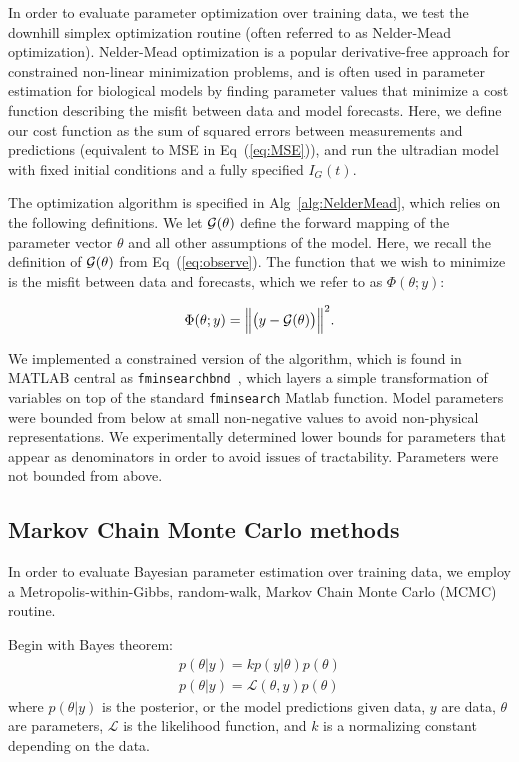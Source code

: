 \documentclass[10pt,letterpaper]{article}
\begin{document}
In order to evaluate parameter optimization over training data, we test the downhill simplex optimization routine (often referred to as Nelder-Mead optimization). 
Nelder-Mead optimization is a popular derivative-free approach for constrained non-linear minimization problems, and is often used in parameter estimation for biological models by finding parameter values that minimize a cost function describing the misfit between data and model forecasts. Here, we define our cost function as the sum of squared errors between measurements and predictions (equivalent to MSE in Eq~(\ref{eq:MSE})), and run the ultradian model with fixed initial conditions and a fully specified $I_G(t)$. 

The optimization algorithm is specified in Alg~\ref{alg:NelderMead}, which relies on the following definitions. We let ${\cal G}(\theta)$ define the forward mapping of the parameter vector $\theta$ and all other assumptions of the model. Here, we recall the definition
of ${\cal G}(\theta)$ from Eq~(\ref{eq:observe}). 
The function that we wish to minimize is the misfit between data and forecasts, which we refer to as $\Phi(\theta;y)$:

\begin{equation}
\label{eq:NMmisfit}
\Phi(\theta;y)=\Bigl\|\bigl(y-{\mathcal G}(\theta)\bigr)\Bigr\|^2.
\end{equation}


We implemented a constrained version of the algorithm, which is found in MATLAB central as \texttt{fminsearchbnd}~\cite{fminsearchbnd}, which layers a simple transformation of variables on top of the standard \texttt{fminsearch} Matlab function. 
Model parameters were bounded from below at small non-negative values to avoid non-physical representations. We experimentally determined lower bounds for parameters that appear as denominators in order to avoid issues of tractability. Parameters were not bounded from above.


\subsection{Markov Chain Monte Carlo methods}
In order to evaluate Bayesian parameter estimation over training data, we employ a Metropolis-within-Gibbs, random-walk, Markov Chain Monte Carlo (MCMC) routine. 

Begin with Bayes theorem:
\begin{align}
p(\theta | y) = k p (y | \theta) p(\theta) \\
p(\theta | y)= \mathcal{L}(\theta, y) p(\theta) 
\end{align}
where $p(\theta | y)$ is the posterior, or the model predictions given data, $y$ are data, $\theta$ are parameters, $\mathcal{L}$ is the likelihood function, and $k$ is a normalizing constant depending on the data. 
\end{document}
